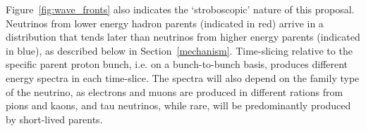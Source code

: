 Figure~\ref{fig:wave_fronts} also indicates the `stroboscopic' nature
of this proposal. Neutrinos from lower energy hadron parents
(indicated in red) arrive in a distribution that tends 
later than neutrinos from higher energy
parents (indicated in blue), as described below in
Section~\ref{mechanism}. Time-slicing relative to the specific parent 
proton  bunch, i.e. on
a bunch-to-bunch basis, produces different energy spectra in each
time-slice. The spectra will also depend on the family type of the
neutrino, as electrons and muons are produced in different rations
from pions and kaons, and tau neutrinos, while rare, will be
predominantly produced by short-lived parents.

